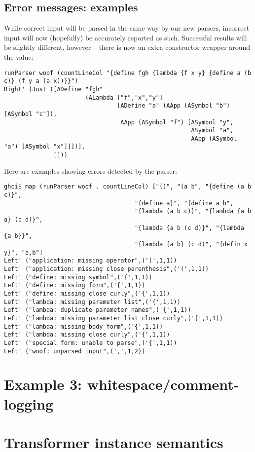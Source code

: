 \documentclass{tmr}
\begin{document}
\subsection{Error messages:  examples}
While correct input will be parsed in the same way by our new parsers, incorrect input will now (hopefully) be
accurately reported as such.  Successful results will be slightly different, however -- there is now an extra
constructor wrapper around the value:
\begin{verbatim}
runParser woof (countLineCol "{define fgh {lambda {f x y} {define a (b c)} (f y a (a x))}}")
Right' (Just ([ADefine "fgh" 
                       (ALambda ["f","x","y"] 
                                [ADefine "a" (AApp (ASymbol "b") [ASymbol "c"]),
                                 AApp (ASymbol "f") [ASymbol "y",
                                                     ASymbol "a",
                                                     AApp (ASymbol "a") [ASymbol "x"]]])],
              []))
\end{verbatim}
Here are examples showing errors detected by the parser:
\begin{verbatim}
ghci$ map (runParser woof . countLineCol) ["()", "(a b", "{define (a b c)}",  
                                     "{define a}", "{define a b", 
                                     "{lambda (a b c)}", "{lambda {a b a} (c d)}", 
                                     "{lambda {a b (c d)}", "{lambda {a b}}", 
                                     "{lambda {a b} (c d)", "{defin x y}", "a,b"]
Left' ("application: missing operator",('(',1,1))
Left' ("application: missing close parenthesis",('(',1,1))
Left' ("define: missing symbol",('{',1,1))
Left' ("define: missing form",('{',1,1))
Left' ("define: missing close curly",('{',1,1))
Left' ("lambda: missing parameter list",('{',1,1))
Left' ("lambda: duplicate parameter names",('{',1,1))
Left' ("lambda: missing parameter list close curly",('{',1,1))
Left' ("lambda: missing body form",('{',1,1))
Left' ("lambda: missing close curly",('{',1,1))
Left' ("special form: unable to parse",('{',1,1))
Left' ("woof: unparsed input",(',',1,2))
\end{verbatim}



\section{Example 3: whitespace/comment-logging}




\section{Transformer instance semantics}
\end{document}
